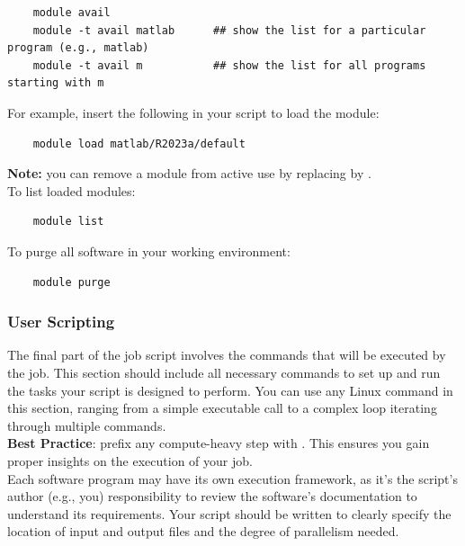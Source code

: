 \begin{verbatim}
    module avail
    module -t avail matlab		## show the list for a particular program (e.g., matlab)
    module -t avail m		    ## show the list for all programs starting with m     
\end{verbatim}
    
\noindent For example, insert the following in your script to load the  module:
\begin{verbatim}
    module load matlab/R2023a/default
\end{verbatim}
    
\noindent \textbf{Note:} you can remove a module from active use by replacing  by .\\
    
\noindent To list loaded modules:
\begin{verbatim}
    module list
\end{verbatim}
    
\noindent To purge all software in your working environment:
\begin{verbatim}
    module purge
\end{verbatim}
    

\subsubsection{User Scripting}
\label{sect:scripting}
The final part of the job script involves the commands that will be executed by the job.
This section should include all necessary commands to set up and run the tasks 
your script is designed to perform. You can use any Linux command in this section, 
ranging from a simple executable call to a complex loop iterating through multiple commands.\\

\noindent \textbf{Best Practice}: prefix any compute-heavy step with .
This ensures you gain proper insights on the execution of your job.\\

\noindent Each software program may have its own execution framework, as it's the script's author (e.g., you) 
responsibility to review the software's documentation to understand its requirements.
Your script should be written to clearly specify the location of input and output files and the degree of parallelism needed.\\

